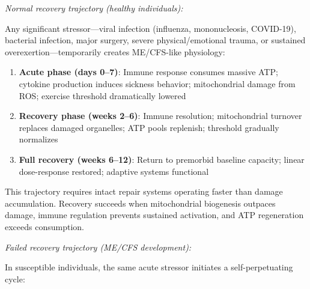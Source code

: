 \textit{Normal recovery trajectory (healthy individuals):}

Any significant stressor---viral infection (influenza, mononucleosis, COVID-19), bacterial infection, major surgery, severe physical/emotional trauma, or sustained overexertion---temporarily creates ME/CFS-like physiology:

\begin{enumerate}
    \item \textbf{Acute phase (days 0--7)}: Immune response consumes massive ATP; cytokine production induces sickness behavior; mitochondrial damage from ROS; exercise threshold dramatically lowered
    \item \textbf{Recovery phase (weeks 2--6)}: Immune resolution; mitochondrial turnover replaces damaged organelles; ATP pools replenish; threshold gradually normalizes
    \item \textbf{Full recovery (weeks 6--12)}: Return to premorbid baseline capacity; linear dose-response restored; adaptive systems functional
\end{enumerate}

This trajectory requires intact repair systems operating faster than damage accumulation. Recovery succeeds when mitochondrial biogenesis outpaces damage, immune regulation prevents sustained activation, and ATP regeneration exceeds consumption.

\textit{Failed recovery trajectory (ME/CFS development):}

In susceptible individuals, the same acute stressor initiates a self-perpetuating cycle:

